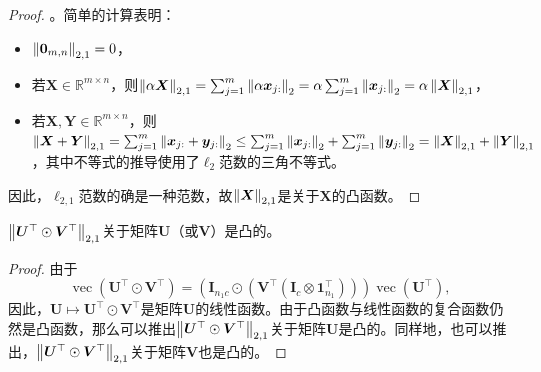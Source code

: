 \begin{proof}
。简单的计算表明：
    \begin{itemize}
        \item $\left\lVert\boldsymbol{0}_{m,n}\right\rVert_{2,1}=0$，
        \item 若$\boldsymbol{X}\in\mathbb{R}^{m\times n}$，则$\left\lVert\alpha\boldsymbol{X}\right\rVert_{2,1}=\sum_{j=1}^{m}\left\lVert\alpha\boldsymbol{x}_{j:}\right\rVert_{2}=\alpha\sum_{j=1}^{m}\left\lVert\boldsymbol{x}_{j:}\right\rVert_{2}=\alpha\left\lVert\boldsymbol{X}\right\rVert_{2,1}$，
        \item 若$\boldsymbol{X},\boldsymbol{Y}\in\mathbb{R}^{m\times n}$，则$\left\lVert\boldsymbol{X}+\boldsymbol{Y}\right\rVert_{2,1}=\sum_{j=1}^{m}\left\lVert\boldsymbol{x}_{j:}+\boldsymbol{y}_{j:}\right\rVert_{2}\leq\sum_{j=1}^{m}\left\lVert\boldsymbol{x}_{j:}\right\rVert_{2}+\sum_{j=1}^{m}\left\lVert\boldsymbol{y}_{j:}\right\rVert_{2}=\left\lVert\boldsymbol{X}\right\rVert_{2,1}+\left\lVert\boldsymbol{Y}\right\rVert_{2,1}$，其中不等式的推导使用了$\ell_{2}$范数的三角不等式。
    \end{itemize}
    因此，$\ell_{2,1}$范数的确是一种范数，故$\left\lVert\boldsymbol{X}\right\rVert_{2,1}$是关于$\boldsymbol{X}$的凸函数。
\end{proof}\vspace{0.5em}

\begin{lemma}\label{lemma:UVcvx2}\kaishu
    $\left\lVert\boldsymbol{U}^{\top}\odot\boldsymbol{V}^{\top}\right\rVert_{2,1}$关于矩阵$\boldsymbol{U}$（或$\boldsymbol{V}$）是凸的。
\end{lemma}

\begin{proof}
    由于
    \begin{equation*}
        \operatorname{vec}\left(\boldsymbol{U}^{\top} \odot \boldsymbol{V}^{\top}\right)=\left(\boldsymbol{I}_{n_{1}c} \odot\left(\boldsymbol{V}^{\top}\left(\boldsymbol{I}_{c} \otimes \boldsymbol{1}^{\top}_{n_{1}}\right)\right)\right)\operatorname{vec}\left(\boldsymbol{U}^{\top}\right),
    \end{equation*}
    因此，$\boldsymbol{U}\mapsto\boldsymbol{U}^{\top}\odot\boldsymbol{V}^{\top}$是矩阵$\boldsymbol{U}$的线性函数。由于凸函数与线性函数的复合函数仍然是凸函数，那么可以推出$\left\lVert\boldsymbol{U}^{\top}\odot\boldsymbol{V}^{\top}\right\rVert_{2,1}$关于矩阵$\boldsymbol{U}$是凸的。同样地，也可以推出，$\left\lVert\boldsymbol{U}^{\top}\odot\boldsymbol{V}^{\top}\right\rVert_{2,1}$关于矩阵$\boldsymbol{V}$也是凸的。
\end{proof}\vspace{0.5em}


